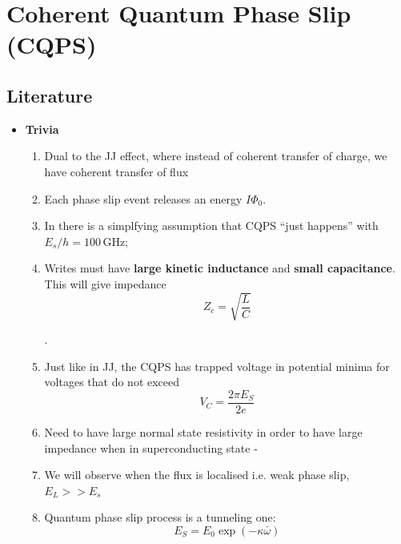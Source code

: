 \newpage

\section{Coherent Quantum Phase Slip (CQPS) \cite{mooij2005} \label{sec:qps}}

\subsection{Literature}
\begin{framed}\noindent
  \begin{itemize}
  \item \textbf{Trivia}
    \begin{enumerate}
    \item Dual to  the JJ effect, where instead of  coherent transfer of charge,
      we have coherent transfer of flux
    \item Each phase slip event releases an energy $I\Phi_0$.
    \item In \cite{mooij2005} there is  a simplfying assumption that CQPS ``just
      happens'' with $E_s/h = 100\,\text{GHz}$;
    \item Writes  must have \textbf{large kinetic  inductance} and \textbf{small
        capacitance}. This will give impedance
      \begin{equation}
        Z_{c} = \sqrt{\frac{L}{C}}
      \end{equation}

      \noindent       {}.

    \item Just like in JJ, the CQPS  has trapped voltage in potential minima for
      voltages that do not exceed
      \begin{equation}
        V_{C} = \frac{2\pi E_{S}}{2e}
      \end{equation}
    \item Need  to have large  normal state resistivity  in order to  have large
      impedance when in superconducting state - 
    \item  We will  observe when  the flux  is localised  i.e. weak  phase slip,
      \,$E_{L}>> E_s$\,
    \item Quantum phase slip process is a tunneling one:
      \begin{equation}
        E_{S} = E_0\exp(-\kappa \bar{\omega})
      \end{equation}


\end{enumerate}
\end{itemize}
\end{framed}
